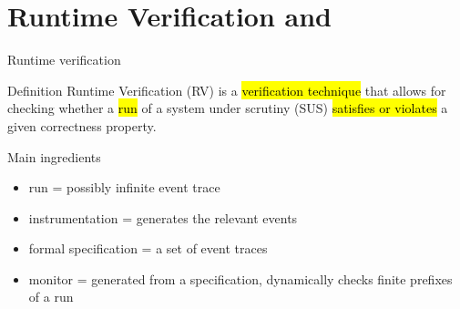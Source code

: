 \documentclass[10pt,usenames,dvipsnames]{beamer}
\begin{document}



\section{Runtime Verification and \rml}

\begin{frame}{Runtime verification}

  \begin{block}{Definition}
    Runtime Verification (RV) is a \hl{verification technique} that allows for checking whether a \hl{run} of a system under scrutiny (SUS) \hl{satisfies or violates} a given correctness property.
  \end{block}

  \begin{block}{Main ingredients}
   \begin{itemize}
   \item run = possibly infinite event trace
   \item instrumentation = generates the relevant events
   \item formal specification = a set of event traces     
   \item monitor =  generated from a specification, dynamically checks finite prefixes of a run 
\end{itemize}
  \end{block}

\end{frame}
\end{document}
